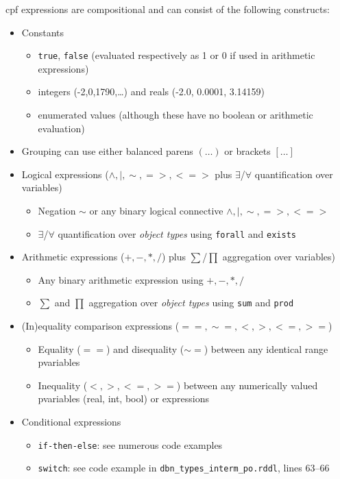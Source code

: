 \documentclass[11pt,a4paper]{article}
\begin{document}
cpf expressions are compositional and can consist of the following
constructs:
\begin{itemize}
    \item Constants 
    \begin{itemize}
        \item \texttt{true}, \texttt{false} (evaluated respectively as 1 or 0 if used in arithmetic expressions)
	\item integers (-2,0,1790,\ldots) and reals (-2.0, 0.0001, 3.14159)
        \item enumerated values (although these have no boolean or arithmetic evaluation)
    \end{itemize}
    \item Grouping can use either balanced parens $(\ldots)$ or brackets $[\ldots]$ 
    \item Logical expressions ($\land,|,\sim,=>,<=>$ plus $\exists$/$\forall$ quantification over variables)
    \begin{itemize}
        \item Negation $\sim$ or any binary logical connective $\land,|,\sim,=>,<=>$
        \item $\exists$/$\forall$ quantification over \emph{object types} using \texttt{forall} and \texttt{exists}
    \end{itemize}
    \item Arithmetic expressions ($+,-,*,/$) plus $\sum$/$\prod$ aggregation over variables)
    \begin{itemize}
        \item Any binary arithmetic expression using $+,-,*,/$
        \item $\sum$ and $\prod$ aggregation over \emph{object types} using \texttt{sum} and \texttt{prod}
    \end{itemize}
    \item (In)equality comparison expressions ($==, \sim=, <, >, <=, >=$)
    \begin{itemize}
        \item Equality ($==$) and disequality ($\sim=$) between any identical range pvariables
        \item Inequality ($<, >, <=, >=$) between any numerically valued pvariables (real, int, bool) or expressions
    \end{itemize}
    \item Conditional expressions 
    \begin{itemize}
        \item \texttt{if-then-else}: see numerous code examples
        \item \texttt{switch}: see code example in \texttt{dbn\_types\_interm\_po.rddl}, lines 63--66
    \end{itemize}


\end{itemize}
\end{document}
